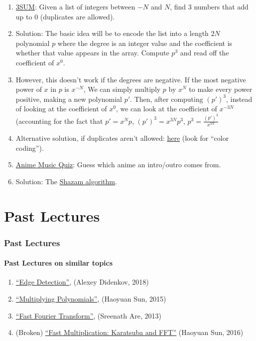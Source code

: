 \documentclass[11pt,handout]{beamer}             %
\begin{document}
\begin{frame}
\begin{enumerate}
  \item \href{https://en.wikipedia.org/wiki/3SUM}{3SUM}:
    Given a list of integers between \( -N \) and \( N \),
    find 3 numbers that add up to 0 (duplicates are allowed). 
    \addtocounter{enumi}{-1}
  \item Solution: The basic idea will be to encode the list into a length \( 2N \)
    polynomial \( p \) where the degree is an integer value and the coefficient
    is whether that value appears in the array.
    Compute \( p^3 \) and read off the coefficient of \( x^0 \).
    \addtocounter{enumi}{-1}
  \item However, this doesn't work if the degrees are negative. If the most
    negative power of \( x \) in \( p \) is \( x^{-N} \), We can simply multiply
    \( p \) by \( x^N \) to make every power positive, making a new polynomial
    \( p' \). Then, after computing \( (p')^3 \), instead of looking at the
    coefficient of \( x^0 \), we can look at the coefficient of \( x^{-3N} \)
    (accounting for the fact that \( p' = x^N p \), \( (p')^3 = x^{3N} p^3 \),
    \( p^3 = \frac{(p')^3}{x^{3N}} \)
    \addtocounter{enumi}{-1}
  \item Alternative solution, if duplicates aren't allowed:
    \href{https://cs.stanford.edu/~rishig/courses/ref/l16.txt}{here}
    (look for \enquote{color coding}).

  \item \href{https://animemusicquiz.com/}{Anime Music Quiz}:
    Guess which anime an intro/outro comes from.
    \addtocounter{enumi}{-1}
  \item Solution: The \href{https://www.toptal.com/algorithms/shazam-it-music-processing-fingerprinting-and-recognition}
    {Shazam algorithm}.
\end{enumerate}
\end{frame}

\section{Past Lectures}

\begin{frame}
\frametitle{Past Lectures}
\framesubtitle{Past Lectures on similar topics}
\begin{enumerate}
  \item \href{https://activities.tjhsst.edu/computervision/lectures/Edge_Detection.pdf}
    {\enquote{Edge Detection}}, (Alexey Didenkov, 2018)
  \item \href{https://activities.tjhsst.edu/sct/lectures/1415/SCT_Multiplying_Polynomials.pdf}
    {\enquote{Multiplying Polynomials}}, (Haoyuan Sun, 2015)
  \item \href{https://activities.tjhsst.edu/sct/lectures/1213/fft.pdf}
    {\enquote{Fast Fourier Transform}}, (Sreenath Are, 2013)
  \item (Broken) \href{https://activities.tjhsst.edu/sct/lectures/1516/SCT_Polynomial.pdf}
    {\enquote{Fast Multiplication: Karatsuba and FFT}} (Haoyuan Sun, 2016)
\end{enumerate}
\end{frame}
\end{document}
